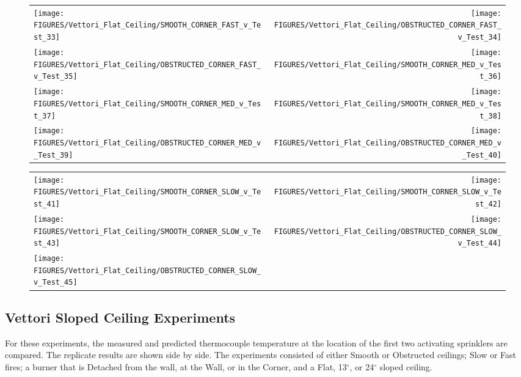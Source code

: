 \begin{figure}[p]
\begin{tabular*}{\textwidth}{l@{\extracolsep{\fill}}r}
\texttt{[image: FIGURES/Vettori\_Flat\_Ceiling/SMOOTH\_CORNER\_FAST\_v\_Test\_33]} &
\texttt{[image: FIGURES/Vettori\_Flat\_Ceiling/OBSTRUCTED\_CORNER\_FAST\_v\_Test\_34]} \\
\texttt{[image: FIGURES/Vettori\_Flat\_Ceiling/OBSTRUCTED\_CORNER\_FAST\_v\_Test\_35]} &
\texttt{[image: FIGURES/Vettori\_Flat\_Ceiling/SMOOTH\_CORNER\_MED\_v\_Test\_36]} \\
\texttt{[image: FIGURES/Vettori\_Flat\_Ceiling/SMOOTH\_CORNER\_MED\_v\_Test\_37]} &
\texttt{[image: FIGURES/Vettori\_Flat\_Ceiling/SMOOTH\_CORNER\_MED\_v\_Test\_38]} \\
\texttt{[image: FIGURES/Vettori\_Flat\_Ceiling/OBSTRUCTED\_CORNER\_MED\_v\_Test\_39]} &
\texttt{[image: FIGURES/Vettori\_Flat\_Ceiling/OBSTRUCTED\_CORNER\_MED\_v\_Test\_40]} \\
\end{tabular*}
\label{Vettori_5}
\end{figure}

\begin{figure}[p]
\begin{tabular*}{\textwidth}{l@{\extracolsep{\fill}}r}
\texttt{[image: FIGURES/Vettori\_Flat\_Ceiling/SMOOTH\_CORNER\_SLOW\_v\_Test\_41]} &
\texttt{[image: FIGURES/Vettori\_Flat\_Ceiling/SMOOTH\_CORNER\_SLOW\_v\_Test\_42]} \\
\texttt{[image: FIGURES/Vettori\_Flat\_Ceiling/SMOOTH\_CORNER\_SLOW\_v\_Test\_43]} &
\texttt{[image: FIGURES/Vettori\_Flat\_Ceiling/OBSTRUCTED\_CORNER\_SLOW\_v\_Test\_44]} \\
\texttt{[image: FIGURES/Vettori\_Flat\_Ceiling/OBSTRUCTED\_CORNER\_SLOW\_v\_Test\_45]} \\
\end{tabular*}
\label{Vettori_6}
\end{figure}


\clearpage

\subsection{Vettori Sloped Ceiling Experiments}
\label{Vettori_Sloped_Results}

For these experiments, the measured and predicted thermocouple temperature at the location of the first two activating sprinklers are compared. The replicate results are shown side by side. The experiments consisted of either Smooth or Obstructed ceilings; Slow or Fast fires; a burner that is Detached from the wall, at the Wall, or in the Corner, and a Flat, 13$^\circ$, or 24$^\circ$ sloped ceiling.

